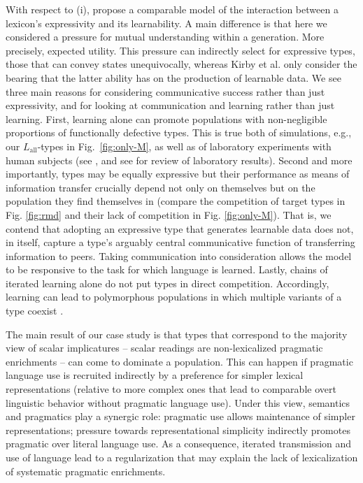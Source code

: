 \documentclass[a4paper, 11pt]{article}
\theoremstyle{Satz}
\newcommand{\mylang}[1]{\ensuremath{L_{\text{#1}}}\xspace} %
\newcommand{\Lall}{\mylang{all}}
\begin{document}
With respect to (i), \citet{kirby+etal:2015} propose a comparable model of the interaction
between a lexicon's expressivity and its learnability. A main difference is that here we
considered a pressure for mutual understanding within a generation. More precisely, expected utility. This pressure can indirectly select for expressive types, those that can convey states unequivocally, whereas Kirby et al. only consider the bearing that the latter ability has on the production of learnable data. We see three main reasons for considering communicative success rather than just
expressivity, and for looking at communication and learning rather than just learning. First, learning alone can  promote populations with non-negligible proportions of functionally defective types. This is true both of simulations, e.g., our $\Lall$-types in Fig.~\ref{fig:only-M}, as well as of laboratory experiments with human subjects (see \citealt{kirby+etal:2008,silvey+etal:2014}, and see \citealt{fay+etal:2013} for review of laboratory results). Second and more importantly, types may be equally expressive but their performance as means of information transfer crucially depend not only on themselves but on the population they find themselves in (compare the competition of target types in Fig. 
\ref{fig:rmd} and their lack of competition in Fig. \ref{fig:only-M}). That is, we contend that adopting an expressive type that generates learnable data does not, in itself, capture a type's arguably central communicative function of transferring information to peers. Taking communication into consideration allows the model to be responsive to the task for which language is learned. Lastly, chains of iterated learning alone do not put types in direct competition. Accordingly, learning can lead to polymorphous populations in which multiple variants of a type coexist \citep{nowak:2006}. 

The main result of our case study is that types that correspond to the majority view of scalar
implicatures -- scalar readings are non-lexicalized pragmatic enrichments -- can come to dominate a
population. This can happen if pragmatic language use is recruited indirectly by a preference for simpler lexical representations (relative to more complex ones that lead to comparable overt linguistic behavior without pragmatic language use). Under this view, semantics
and pragmatics play a synergic role: pragmatic use allows maintenance of simpler representations;
pressure towards representational simplicity indirectly promotes pragmatic over literal
language use. As a consequence, iterated transmission and use of language lead to a
regularization that may explain the lack of lexicalization of systematic pragmatic enrichments.
\end{document}
